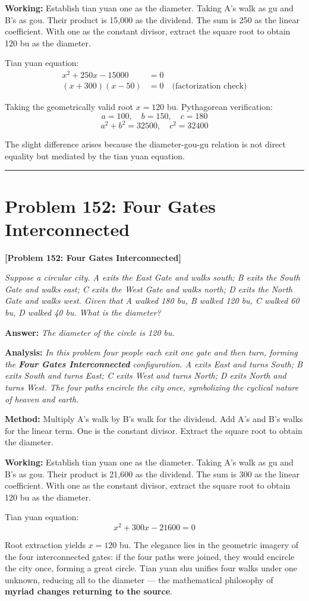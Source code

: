 \documentclass[11pt,a4paper]{book}
\newcommand{\answer}[1]{\noindent\textbf{\color{anacolor}Answer: }\textit{#1}\par}
\newcommand{\method}[1]{\noindent\textbf{\color{methodcolor}Method: }#1\par}
\newcommand{\working}[1]{\noindent\textbf{\color{workcolor}Working: }#1\par}
\newcommand{\analysis}[1]{\noindent\textbf{\color{anacolor}Analysis: }\textit{#1}\par}
\newcommand{\shortline}{\noindent\rule{0.5\textwidth}{0.4pt}\par}
\begin{document}
\working{Establish tian yuan one as the diameter. Taking A's walk as gu and B's as gou. Their product is 15,000 as the dividend. The sum is 250 as the linear coefficient. With one as the constant divisor, extract the square root to obtain 120 bu as the diameter.

Tian yuan equation:
\begin{align*}
x^2 + 250x - 15000 &= 0 \\
(x + 300)(x - 50) &= 0 \quad \text{(factorization check)}
\end{align*}

Taking the geometrically valid root $x = 120$ bu. Pythagorean verification:
$$a = 100, \quad b = 150, \quad c = 180$$
$$a^2 + b^2 = 32500, \quad c^2 = 32400$$

The slight difference arises because the diameter-gou-gu relation is not direct equality but mediated by the tian yuan equation.}

\shortline

\section{Problem 152: Four Gates Interconnected}
\label{sec:prob152}

\noindent\textbf{\color{probcolor}[Problem 152: Four Gates Interconnected]}

\textit{Suppose a circular city. A exits the East Gate and walks south; B exits the South Gate and walks east; C exits the West Gate and walks north; D exits the North Gate and walks west. Given that A walked 180 bu, B walked 120 bu, C walked 60 bu, D walked 40 bu. What is the diameter?}

\answer{The diameter of the circle is 120 bu.}

\analysis{In this problem four people each exit one gate and then turn, forming the \textbf{Four Gates Interconnected} configuration. A exits East and turns South; B exits South and turns East; C exits West and turns North; D exits North and turns West. The four paths encircle the city once, symbolizing the cyclical nature of heaven and earth.}

\method{Multiply A's walk by B's walk for the dividend. Add A's and B's walks for the linear term. One is the constant divisor. Extract the square root to obtain the diameter.}

\working{Establish tian yuan one as the diameter. Taking A's walk as gu and B's as gou. Their product is 21,600 as the dividend. The sum is 300 as the linear coefficient. With one as the constant divisor, extract the square root to obtain 120 bu as the diameter.

Tian yuan equation:
$$x^2 + 300x - 21600 = 0$$

Root extraction yields $x = 120$ bu. The elegance lies in the geometric imagery of the four interconnected gates: if the four paths were joined, they would encircle the city once, forming a great circle. Tian yuan shu unifies four walks under one unknown, reducing all to the diameter --- the mathematical philosophy of \textbf{myriad changes returning to the source}.}
\end{document}
